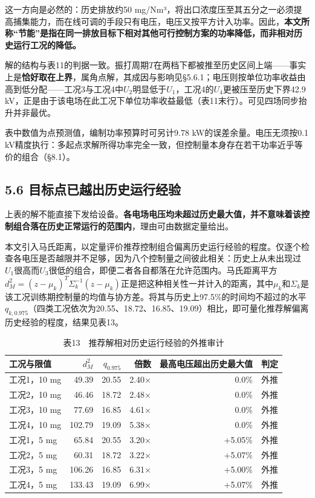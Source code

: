 \documentclass[UTF8,zihao=5,a4paper]{ctexart}
\begin{document}
这一方向是必然的：历史排放约50 mg/Nm³，将出口浓度压至其五分之一必须提高捕集能力，而在线可调的手段只有电压，电压又按平方计入功率。因此，\textbf{本文所称“节能”是指在同一排放目标下相对其他可行控制方案的功率降低，而非相对历史运行工况的降低。}

解的结构与表11的判据一致。振打周期$T$在两档下都被推至历史区间上端——事实上是\textbf{恰好取在上界}，属角点解，其成因与影响见§5.6.1；电压则按单位功率收益由高到低分配——工况3与工况4中$U_2$明显低于$U_1$，工况4的$U_4$更被压至历史下界42.9 kV，正是由于该电场在此工况下单位功率收益最低（表11末行）。可见四场同步抬升并非最优。

表中数值为点预测值，编制功率预算时可另计9.78 kW的误差余量。电压无须按0.1 kV精度执行：多起点求解所得功率完全一致，但控制量本身存在若干功率近乎等价的组合（§8.1）。

\subsection*{5.6 目标点已越出历史运行经验}

上表的解不能直接下发给设备。\textbf{各电场电压均未超过历史最大值，并不意味着该控制组合落在历史正常运行的范围内}，理由可由数据定量给出。

本文引入马氏距离，以定量评价推荐控制组合偏离历史运行经验的程度。仅逐个检查各电压是否越限并不足够，因为八个控制量之间彼此相关：历史上从未出现过$U_1$很高而$U_3$很低的组合，即便二者各自都落在允许范围内。马氏距离平方$d_M^2=(z-\mu_k)^T\Sigma_k^{-1}(z-\mu_k)$正是把这种相关性一并计入的距离，其中$\mu_k$和$\Sigma_k$是该工况训练期控制量的均值与协方差。将其与历史上97.5\%的时间均不超过的水平$q_{k,0.975}$（四类工况依次为20.55、18.72、16.85、19.09）相比，即可量化推荐解偏离历史经验的程度，结果见表13。


\begin{table}[htbp]
\centering
\caption*{\normalsize 表13　推荐解相对历史运行经验的外推审计}
\vspace{-2pt}
\begin{tabular}{lrrrrc}
\toprule
工况与限值 & $d_M^2$ & $q_{0.975}$ & 倍数 & 最高电压超出历史最大值 & 判定 \\
\midrule
工况1，10 mg & 49.39 & 20.55 & 2.40× & 0.0\% & 外推 \\
工况2，10 mg & 46.46 & 18.72 & 2.48× & 0.0\% & 外推 \\
工况3，10 mg & 77.69 & 16.85 & 4.61× & 0.0\% & 外推 \\
工况4，10 mg & 102.79 & 19.09 & 5.38× & 0.0\% & 外推 \\
工况1，5 mg & 65.84 & 20.55 & 3.20× & +5.05\% & 外推 \\
工况2，5 mg & 60.31 & 18.72 & 3.22× & +5.07\% & 外推 \\
工况3，5 mg & 106.26 & 16.85 & 6.31× & +5.00\% & 外推 \\
工况4，5 mg & 133.43 & 19.09 & 6.99× & +5.07\% & 外推 \\
\bottomrule
\end{tabular}
\end{table}
\end{document}
